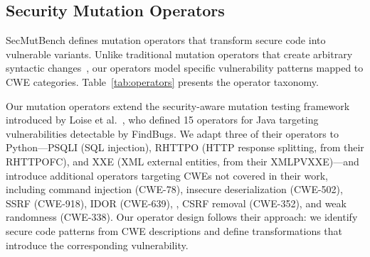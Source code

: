 \documentclass[sigconf,anonymous,review]{acmart}
\begin{document}
\subsection{Security Mutation Operators}

SecMutBench defines  mutation operators that transform secure code into vulnerable variants. Unlike traditional mutation operators that create arbitrary syntactic changes~\cite{demillo1978hints}, our operators model specific vulnerability patterns mapped to CWE categories. Table~\ref{tab:operators} presents the operator taxonomy.

Our mutation operators extend the security-aware mutation testing framework introduced by Loise et al.~\cite{loise2017security}, who defined 15 operators for Java targeting vulnerabilities detectable by FindBugs. We adapt three of their operators to Python---PSQLI (SQL injection), RHTTPO (HTTP response splitting, from their RHTTPOFC), and XXE (XML external entities, from their XMLPVXXE)---and introduce  additional operators targeting CWEs not covered in their work, including command injection (CWE-78), insecure deserialization (CWE-502), SSRF (CWE-918), IDOR (CWE-639), , CSRF removal (CWE-352), and weak randomness (CWE-338). Our operator design follows their approach: we identify secure code patterns from CWE descriptions and define transformations that introduce the corresponding vulnerability.
\end{document}
